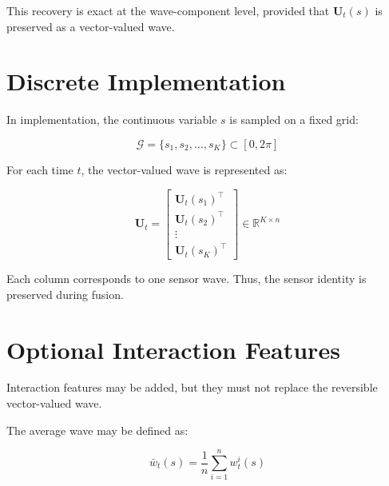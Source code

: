 \documentclass[a4paper]{article}
\begin{document}
        This recovery is exact at the wave-component level, provided that \(\mathbf{U}_t(s)\) is preserved as a vector-valued wave.
    
    
    \section{Discrete Implementation}
        
        In implementation, the continuous variable \(s\) is sampled on a fixed grid:
        
        \begin{equation}
            \mathcal{G}
            =
            \{
            s_1,
            s_2,
            \ldots,
            s_K
            \}
            \subset
            [0,2\pi]
        \end{equation}
        
        For each time \(t\), the vector-valued wave is represented as:
        
        \begin{equation}
            \mathbf{U}_t
            =
            \begin{bmatrix}
                \mathbf{U}_t(s_1)^{\top}
                \\
                \mathbf{U}_t(s_2)^{\top}
                \\
                \vdots
                \\
                \mathbf{U}_t(s_K)^{\top}
            \end{bmatrix}
            \in
            \mathbb{R}^{K \times n}
        \end{equation}
        
        Each column corresponds to one sensor wave.
        Thus, the sensor identity is preserved during fusion.
    
    
    \section{Optional Interaction Features}
        
        Interaction features may be added, but they must not replace the reversible vector-valued wave.
        
        The average wave may be defined as:
        
        \begin{equation}
            \bar{w}_t(s)
            =
            \frac{1}{n}
            \sum_{i=1}^{n}
            w_t^i(s)
        \end{equation}
        
\end{document}
